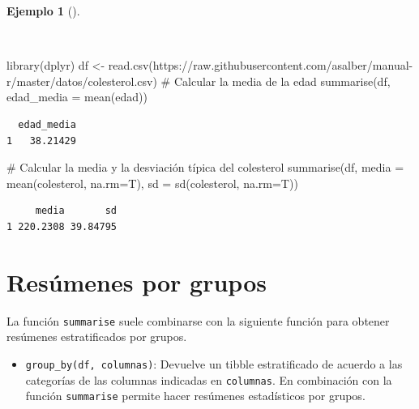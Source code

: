 \documentclass[
  a4paper,
]{scrreport}
\newenvironment{Shaded}{\begin{snugshade}}{\end{snugshade}}
\newcommand{\AttributeTok}[1]{\textcolor[rgb]{0.40,0.45,0.13}{#1}}
\newcommand{\CommentTok}[1]{\textcolor[rgb]{0.37,0.37,0.37}{#1}}
\newcommand{\FunctionTok}[1]{\textcolor[rgb]{0.28,0.35,0.67}{#1}}
\newcommand{\NormalTok}[1]{\textcolor[rgb]{0.00,0.23,0.31}{#1}}
\newcommand{\OtherTok}[1]{\textcolor[rgb]{0.00,0.23,0.31}{#1}}
\newcommand{\StringTok}[1]{\textcolor[rgb]{0.13,0.47,0.30}{#1}}
\providecommand{\tightlist}{%
  \setlength{\itemsep}{0pt}\setlength{\parskip}{0pt}}\usepackage{longtable,booktabs,array}
\theoremstyle{definition}
\theoremstyle{definition}
\newtheorem{example}{Ejemplo}[chapter]
\theoremstyle{remark}
\begin{document}
\begin{example}[]\protect\hypertarget{exm-sumarise}{}\label{exm-sumarise}

~

\begin{Shaded}
\begin{Highlighting}[]
\FunctionTok{library}\NormalTok{(dplyr)}
\NormalTok{df }\OtherTok{\textless{}{-}} \FunctionTok{read.csv}\NormalTok{(}\StringTok{\textquotesingle{}https://raw.githubusercontent.com/asalber/manual{-}r/master/datos/colesterol.csv\textquotesingle{}}\NormalTok{)}
\CommentTok{\# Calcular la media de la edad}
\FunctionTok{summarise}\NormalTok{(df, }\AttributeTok{edad\_media =} \FunctionTok{mean}\NormalTok{(edad))}
\end{Highlighting}
\end{Shaded}

\begin{verbatim}
  edad_media
1   38.21429
\end{verbatim}

\begin{Shaded}
\begin{Highlighting}[]
\CommentTok{\# Calcular la media y la desviación típica del colesterol}
\FunctionTok{summarise}\NormalTok{(df, }\AttributeTok{media =} \FunctionTok{mean}\NormalTok{(colesterol, }\AttributeTok{na.rm=}\NormalTok{T), }\AttributeTok{sd =} \FunctionTok{sd}\NormalTok{(colesterol, }\AttributeTok{na.rm=}\NormalTok{T))}
\end{Highlighting}
\end{Shaded}

\begin{verbatim}
     media       sd
1 220.2308 39.84795
\end{verbatim}

\end{example}

\section{Resúmenes por grupos}\label{resuxfamenes-por-grupos}

La función \texttt{summarise} suele combinarse con la siguiente función
para obtener resúmenes estratificados por grupos.

\begin{itemize}
\tightlist
\item
  \texttt{group\_by(df,\ columnas)}: Devuelve un tibble estratificado de
  acuerdo a las categorías de las columnas indicadas en
  \texttt{columnas}. En combinación con la función \texttt{summarise}
  permite hacer resúmenes estadísticos por grupos.
\end{itemize}
\end{document}
